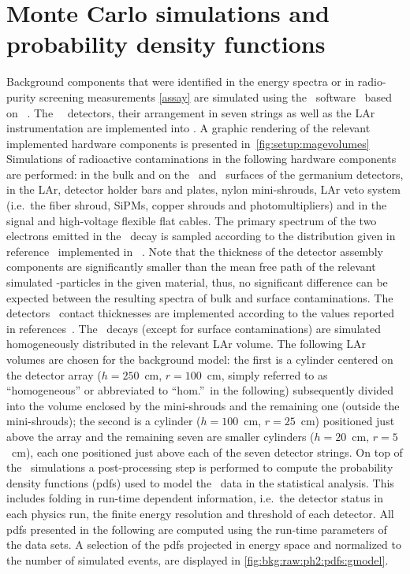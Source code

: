 
\chapter{Monte Carlo simulations and probability density functions}%
\label{apdx:magepdfs}


Background components that were identified in the energy spectra or in
radio-purity screening measurements \cref{assay} are simulated using the
\mage\ software~\cite{Boswell2011} based on
\geant~\cite{Agostinelli2002, Allison2006, Allison2016}.  The \gerda\
\phasetwo\ detectors, their arrangement in seven strings as well as the
LAr instrumentation are implemented into \mage. A graphic rendering of
the relevant implemented hardware components is presented
in~\cref{fig:setup:magevolumes}
\newpar
Simulations of radioactive contaminations
in the following hardware components are performed: in the bulk and on
the \pplus\ and \nplus\ surfaces of the germanium detectors, in the LAr,
detector holder bars and plates, nylon mini-shrouds, LAr veto system
(i.e.~the fiber shroud, SiPMs, copper shrouds and photomultipliers) and
in the signal and high-voltage flexible flat cables. The primary
spectrum of the two electrons emitted in the \nnbb\ decay is sampled
according to the distribution given in reference~\cite{Tretyak1995}
implemented in \decayzero~\cite{Ponkratenko2000}. Note that the
thickness of the detector assembly components are significantly smaller
than the mean free path of the relevant simulated \g-particles in
the given material, thus, no significant difference can be expected
between the resulting spectra of bulk and surface contaminations. The
detectors \nplus\ contact thicknesses are implemented according to the
values reported in references~\cite{Agostini2013a, Agostini2019}.
\newpar
The \kvz\ decays (except for surface contaminations) are simulated
homogeneously distributed in the relevant LAr volume. The following LAr
volumes are chosen for the background model: the first is a cylinder
centered on the detector array ($h=250$~cm, $r=100$~cm, simply referred
to as ``homogeneous'' or abbreviated to ``hom.''~in the following)
subsequently divided into the volume enclosed by the mini-shrouds and
the remaining one (outside the mini-shrouds); the second is a cylinder
($h=100$~cm, $r=25$~cm) positioned just above the array and the
remaining seven are smaller cylinders ($h=20$~cm, $r=5$~cm), each one
positioned just above each of the seven detector strings.
\newpar
On top of the \mage\ simulations a post-processing step is performed to
compute the probability density functions (pdfs) used to model the
\gerda\ data in the statistical analysis. This includes folding in
run-time dependent information, i.e.~the detector status in each physics
run, the finite energy resolution and threshold of each detector. All
pdfs presented in the following are computed using the run-time
parameters of the data sets. A selection of the pdfs projected in energy
space and normalized to the number of simulated events, are
displayed in \cref{fig:bkg:raw:ph2:pdfs:gmodel}. 

